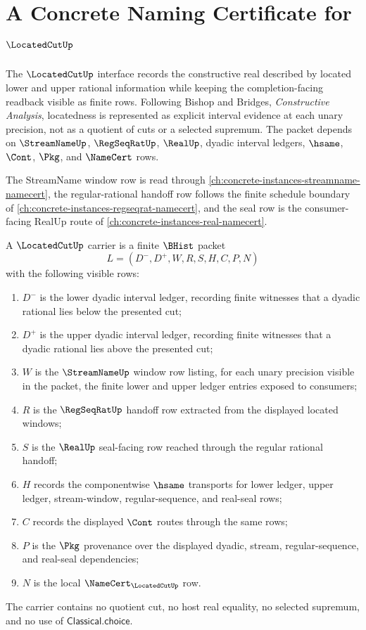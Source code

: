 \chapter{A Concrete Naming Certificate for $\LocatedCutUp$}
\label{ch:concrete-instances-locatedcut-namecert}

The $\LocatedCutUp$ interface records the constructive real described by located lower and upper rational information while keeping the completion-facing readback visible as finite rows. Following Bishop and Bridges, \emph{Constructive Analysis}, locatedness is represented as explicit interval evidence at each unary precision, not as a quotient of cuts or a selected supremum. The packet depends on $\StreamNameUp$, $\RegSeqRatUp$, $\RealUp$, dyadic interval ledgers, $\hsame$, $\Cont$, $\Pkg$, and $\NameCert$ rows.

The StreamName window row is read through \autoref{ch:concrete-instances-streamname-namecert}, the regular-rational handoff row follows the finite schedule boundary of \autoref{ch:concrete-instances-regseqrat-namecert}, and the seal row is the consumer-facing RealUp route of \autoref{ch:concrete-instances-real-namecert}.

\begin{definition}
\label{def:located-cut-carrier}
A $\LocatedCutUp$ carrier is a finite $\BHist$ packet
$$
L=(D^{-},D^{+},W,R,S,H,C,P,N)
$$
with the following visible rows:
\begin{enumerate}
\item $D^{-}$ is the lower dyadic interval ledger, recording finite witnesses that a dyadic rational lies below the presented cut;
\item $D^{+}$ is the upper dyadic interval ledger, recording finite witnesses that a dyadic rational lies above the presented cut;
\item $W$ is the $\StreamNameUp$ window row listing, for each unary precision visible in the packet, the finite lower and upper ledger entries exposed to consumers;
\item $R$ is the $\RegSeqRatUp$ handoff row extracted from the displayed located windows;
\item $S$ is the $\RealUp$ seal-facing row reached through the regular rational handoff;
\item $H$ records the componentwise $\hsame$ transports for lower ledger, upper ledger, stream-window, regular-sequence, and real-seal rows;
\item $C$ records the displayed $\Cont$ routes through the same rows;
\item $P$ is the $\Pkg$ provenance over the displayed dyadic, stream, regular-sequence, and real-seal dependencies;
\item $N$ is the local $\NameCert_{\LocatedCutUp}$ row.
\end{enumerate}
The carrier contains no quotient cut, no host real equality, no selected supremum, and no use of $\mathsf{Classical.choice}$.
\end{definition}

